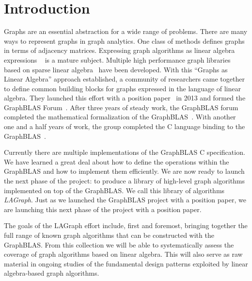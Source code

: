 \section{Introduction}
\label{sec:intro}



Graphs are an essential abstraction for a wide range of problems.  There are 
many ways to represent graphs in graph analytics.  One class of methods defines
graphs in terms of adjacency matrices.
% 
Expressing graph algorithms as linear algebra expressions ~\cite{kepner2011graph}
is a mature subject.  Multiple 
high performance graph libraries based on sparse 
linear algebra~\cite{combblas,
gadepally2015graphulo, gpi2016, sundaram2015graphmat,che2016programming}
have been developed.   With this ``Graphs as Linear Algebra'' approach established, 
a community of researchers came together to define common building
blocks for graphs expressed in the language of linear algebra.  They launched
this effort with a position paper~\cite{hpec13} in 2013 and formed the GraphBLAS
Forum~\cite{graphblas_web}.  After  three years of steady work,
the GraphBLAS forum completed the
mathematical formalization of the GraphBLAS~\cite{mathgraphblas16}. With another 
one and a half years of work, the group completed the C
language binding to the GraphBLAS~\cite{cspec}.

Currently there are multiple implementations of the GraphBLAS C specification.  
We have learned a great deal about how to define the operations within the GraphBLAS 
and how to implement them efficiently.  We are now ready to launch the next phase of the project:
to produce a library of high-level graph algorithms implemented on top of the GraphBLAS.
We call this library of algorithms \emph{LAGraph}.
Just as we launched the GraphBLAS project with a position paper, we are launching 
this next phase of the project with a position paper.  

The goals of the LAGraph effort include, first and foremost, bringing together the full 
range of known graph algorithms that can be constructed with the GraphBLAS.
From this collection we will be able to systematically assess the coverage of 
graph algorithms based on linear algebra. This will also serve
as raw material in ongoing studies of the fundamental design patterns exploited 
by linear algebra-based graph algorithms. 

